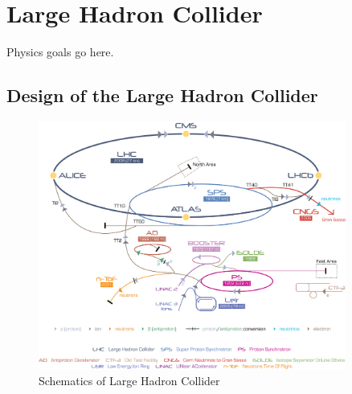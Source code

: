
\chapter{Large Hadron Collider} %

\label{Chapter3} %



Physics goals go here.


\section{Design of the Large Hadron Collider}


\begin{figure}[htbp]
	\centering
		\includegraphics[width=0.9\textwidth]{Figures/LHC.jpg}
	\caption[Schematics of Large Hadron Collider]{Schematics of Large Hadron Collider}
	\label{fig:LHC}
\end{figure}

